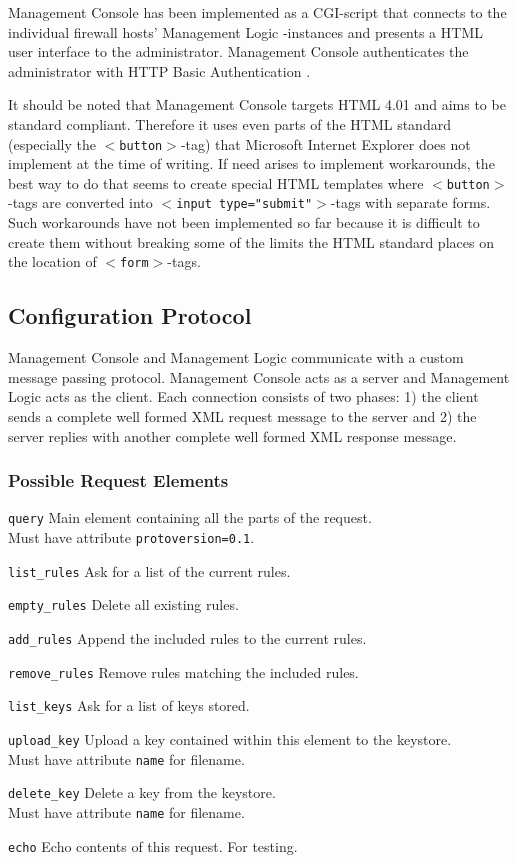 \documentclass[a4paper,titlepage]{article}
\begin{document}
Management Console has been implemented as a CGI-script that connects
to the individual firewall hosts' Management Logic -instances and
presents a HTML user interface to the administrator. Management
Console authenticates the administrator with HTTP Basic Authentication
\cite{rfc2617}.

It should be noted that Management Console targets HTML
4.01\cite{html401} and aims to be standard compliant. Therefore it
uses even parts of the HTML standard (especially the
$<$\texttt{button}$>$-tag) that Microsoft Internet Explorer does not
implement at the time of writing. If need arises to implement
workarounds, the best way to do that seems to create special HTML
templates where $<$\texttt{button}$>$-tags are converted into
$<$\texttt{input type="submit"}$>$-tags with separate forms. Such
workarounds have not been implemented so far because it is difficult
to create them without breaking some of the limits the HTML standard
places on the location of $<$\texttt{form}$>$-tags.

\subsection{Configuration Protocol}

Management Console and Management Logic communicate with a custom
message passing protocol. Management Console acts as a server and
Management Logic acts as the client. Each connection consists of two
phases: 1) the client sends a complete well formed XML request message
to the server and 2) the server replies with another complete well
formed XML response message.

\subsubsection*{Possible Request Elements}

\begin{description}
\item \texttt{query} Main element containing all the parts of the request. \\
	Must have attribute \texttt{protoversion=0.1}.
\item \texttt{list\_rules} Ask for a list of the current rules.
\item \texttt{empty\_rules} Delete all existing rules.
\item \texttt{add\_rules} Append the included rules to the current rules.
\item \texttt{remove\_rules} Remove rules matching the included rules.
\item \texttt{list\_keys} Ask for a list of keys stored.
\item \texttt{upload\_key} Upload a key contained within this element to the keystore. \\
	Must have attribute \texttt{name} for filename.
\item \texttt{delete\_key} Delete a key from the keystore. \\
	Must have attribute \texttt{name} for filename.
\item \texttt{echo} Echo contents of this request. For testing.
\end{description}
\end{document}

